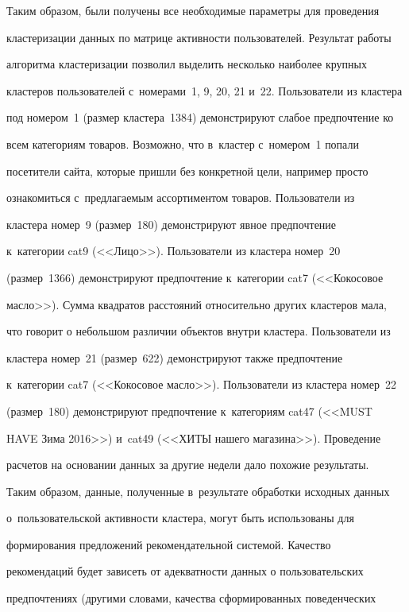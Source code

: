   Таким образом, были получены все необходимые параметры для проведения 


кластеризации данных по матрице активности пользователей. Результат работы 


алгоритма кластеризации позволил выделить несколько наиболее крупных 


клас\-те\-ров пользователей с~номерами~1, 9, 20, 21 и~22. Пользователи из кластера 


под номером~1 (размер кластера~1384) демонстрируют слабое предпочтение ко 


всем категориям товаров. Возможно, что в~кластер с~номером~1 попали 


посетители сайта, которые пришли без конкретной цели, например просто 


ознакомиться с~предлагаемым ассортиментом товаров. Пользователи из 


кластера номер~9 (размер~180) демонстрируют явное предпочтение 


к~категории cat9 (<<Лицо>>). Пользователи из кластера номер~20 


(размер~1366) демонстрируют предпочтение к~категории cat7 (<<Кокосовое 


масло>>). Сумма квадратов расстояний относительно других кластеров мала, 


что говорит о небольшом различии объектов внутри кластера. Пользователи из 


кластера номер~21 (размер~622) демонстрируют также предпочтение 


к~категории cat7 (<<Кокосовое масло>>). Пользователи из кластера номер~22 


(размер~180) демонстрируют предпочтение к~категориям cat47 (<<MUST 


HAVE Зима 2016>>) и~cat49 (<<ХИТЫ нашего магазина>>). Проведение 


расчетов на основании данных за другие недели дало похожие результаты.


  


  Таким образом, данные, полученные в~результате обработки исходных данных 


о~пользовательской активности кластера, могут быть использованы для 


формирования предложений рекомендательной системой. Качество 


рекомендаций будет зависеть от адекватности данных о пользовательских 


предпочтениях (другими словами, качества сформированных поведенческих 


